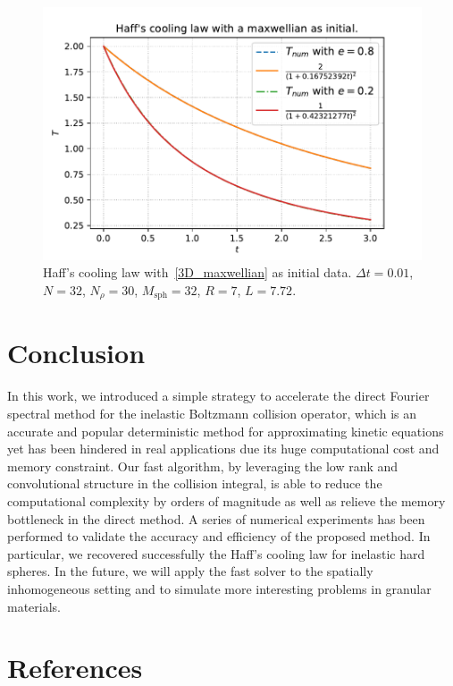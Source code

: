 \documentclass[review,times]{elsarticle}
\begin{document}
\begin{figure}[htp!]
  \centering
  \includegraphics[width = .8\linewidth]{Haff_cooling_maxwellian}
  \caption{\color{blue} Haff's cooling law {\color{red} with~\eqref{3D_maxwellian} as initial data}. $\Delta t=0.01$, $N=32$, $N_{\rho}=30$, $M_{\text{sph}}=32$, $R=7$, $L=7.72$.}
  \label{Haff_cooling_maxwellian}
\end{figure}


\section{Conclusion}

In this work, we introduced a simple strategy to accelerate the direct Fourier spectral method for the inelastic Boltzmann collision operator, which is an accurate and popular deterministic method for approximating kinetic equations yet has been hindered in real applications due its huge computational cost and memory constraint. Our fast algorithm, by leveraging the low rank and convolutional structure in the collision integral, is able to reduce the computational complexity by orders of magnitude as well as relieve the memory bottleneck in the direct method. A series of numerical experiments has been performed to validate the accuracy and efficiency of the proposed method. In particular, we recovered successfully the Haff's cooling law for inelastic hard spheres. In the future, we will apply the fast solver to the spatially inhomogeneous setting and to simulate more interesting problems in granular materials.




\section*{References}


\end{document}
